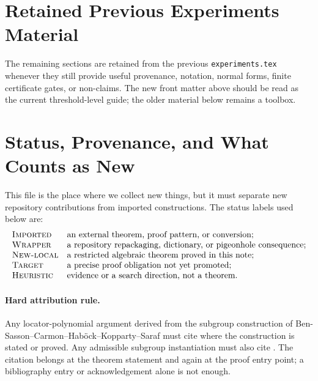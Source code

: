 \documentclass[11pt]{article}
\begin{document}
\section{Retained Previous Experiments Material}
\label{sec:retained-previous-experiments-material}

The remaining sections are retained from the previous \texttt{experiments.tex}
whenever they still provide useful provenance, notation, normal forms, finite
certificate gates, or non-claims.  The new front matter above should be read as
the current threshold-level guide; the older material below remains a toolbox.

\section{Status, Provenance, and What Counts as New}

This file is the place where we collect new things, but it must separate new
repository contributions from imported constructions.  The status labels used
below are:
\[
\begin{array}{ll}
\textsc{Imported} & \text{an external theorem, proof pattern, or conversion;}\\
\textsc{Wrapper} & \text{a repository repackaging, dictionary, or pigeonhole consequence;}\\
\textsc{New-local} & \text{a restricted algebraic theorem proved in this note;}\\
\textsc{Target} & \text{a precise proof obligation not yet promoted;}\\
\textsc{Heuristic} & \text{evidence or a search direction, not a theorem.}
\end{array}
\]

\paragraph{Hard attribution rule.}
Any locator-polynomial argument derived from the subgroup construction of
Ben-Sasson--Carmon--Hab\"ock--Kopparty--Saraf must cite \cite[Thm.~7.1]{BCHKS25}
where the construction is stated or proved.  Any admissible subgroup
instantiation must also cite \cite[Thm.~1.13]{BCHKS25}.  The citation belongs
at the theorem statement and again at the proof entry point; a bibliography
entry or acknowledgement alone is not enough.
\end{document}
